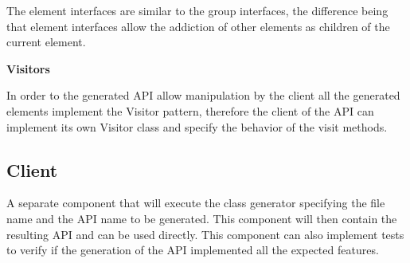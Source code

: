 The element interfaces are similar to the group interfaces, the difference being that element interfaces allow the addiction of other elements as children of the current element. 

\textbf{Visitors}

In order to the generated API allow manipulation by the client all the generated elements implement the Visitor pattern, therefore the client of the API can implement its own Visitor class and specify the behavior of the visit methods.

\subsection{Client}

A separate component that will execute the class generator specifying the file name and the API name to be generated. This component will then contain the resulting API and can be used directly. This component can also implement tests to verify if the generation of the API implemented all the expected features.
